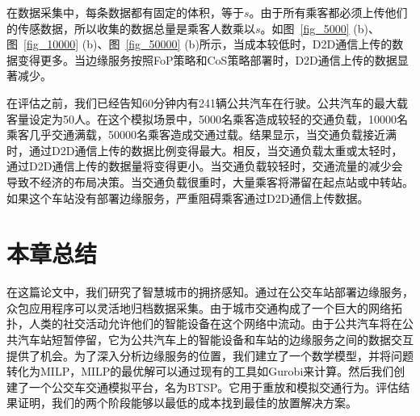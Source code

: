 在数据采集中，每条数据都有固定的体积，等于$s$。由于所有乘客都必须上传他们的传感数据，所以收集的数据总量是乘客人数乘以$s$。如图~\ref{fig_5000} (b)、图~\ref{fig_10000} (b)、图~\ref{fig_50000} (b)所示，当成本较低时，D2D通信上传的数据变得更多。当边缘服务按照FoP策略和CoS策略部署时，D2D通信上传的数据显著减少。

在评估之前，我们已经告知60分钟内有241辆公共汽车在行驶。公共汽车的最大载客量设定为50人。在这个模拟场景中，5000名乘客造成较轻的交通负载，10000名乘客几乎交通满载，50000名乘客造成交通过载。结果显示，当交通负载接近满时，通过D2D通信上传的数据比例变得最大。相反，当交通负载太重或太轻时，通过D2D通信上传的数据量将变得更小。当交通负载较轻时，交通流量的减少会导致不经济的布局决策。当交通负载很重时，大量乘客将滞留在起点站或中转站。如果这个车站没有部署边缘服务，严重阻碍乘客通过D2D通信上传数据。

\section{本章总结}

在这篇论文中，我们研究了智慧城市的拥挤感知。通过在公交车站部署边缘服务，众包应用程序可以灵活地归档数据采集。由于城市交通构成了一个巨大的网络拓扑，人类的社交活动允许他们的智能设备在这个网络中流动。由于公共汽车将在公共汽车站短暂停留，它为公共汽车上的智能设备和车站的边缘服务之间的数据交互提供了机会。为了深入分析边缘服务的位置，我们建立了一个数学模型，并将问题转化为MILP，MILP的最优解可以通过现有的工具如Gurobi来计算。然后我们创建了一个公交车交通模拟平台，名为BTSP。它用于重放和模拟交通行为。评估结果证明，我们的两个阶段能够以最低的成本找到最佳的放置解决方案。

